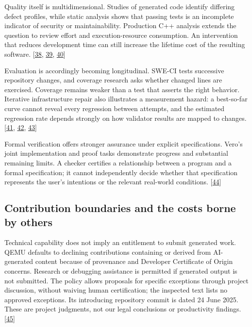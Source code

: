 Quality itself is multidimensional. Studies of generated code identify differing defect profiles, while static analysis shows that passing tests is an incomplete indicator of security or maintainability. Production C++ analysis extends the question to review effort and execution-resource consumption. An intervention that reduces development time can still increase the lifetime cost of the resulting software. [\hyperlink{ref-cotroneo2025}{38}, \hyperlink{ref-sabra2025}{39}, \hyperlink{ref-tran2026}{40}]


Evaluation is accordingly becoming longitudinal. SWE-CI tests successive repository changes, and coverage research asks whether changed lines are exercised. Coverage remains weaker than a test that asserts the right behavior. Iterative infrastructure repair also illustrates a measurement hazard: a best-so-far curve cannot reveal every regression between attempts, and the estimated regression rate depends strongly on how validator results are mapped to changes. [\hyperlink{ref-sweci2026}{41}, \hyperlink{ref-coverage2026}{42}, \hyperlink{ref-iac2026}{43}]


Formal verification offers stronger assurance under explicit specifications. Vero's joint implementation and proof tasks demonstrate progress and substantial remaining limits. A checker certifies a relationship between a program and a formal specification; it cannot independently decide whether that specification represents the user's intentions or the relevant real-world conditions. [\hyperlink{ref-vero2026}{44}]



\subsection*{Contribution boundaries and the costs borne by others}
Technical capability does not imply an entitlement to submit generated work. QEMU defaults to declining contributions containing or derived from AI-generated content because of provenance and Developer Certificate of Origin concerns. Research or debugging assistance is permitted if generated output is not submitted. The policy allows proposals for specific exceptions through project discussion, without waiving human certification; the inspected text lists no approved exceptions. Its introducing repository commit is dated 24 June 2025. These are project judgments, not our legal conclusions or productivity findings. [\hyperlink{ref-qemupolicy2026}{45}]


